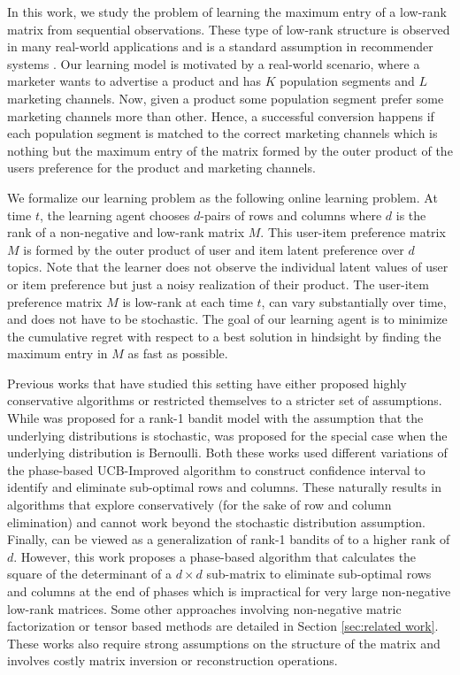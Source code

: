 In this work, we study the problem of learning the maximum entry of a low-rank matrix from sequential observations. These type of low-rank structure is observed in many real-world applications and is a standard assumption in recommender systems \citep{koren2009matrix,ricci2011liorrokach}. Our learning model is motivated by a real-world scenario, where a marketer wants to advertise a product and has $K$ population segments and $L$ marketing channels. Now, given a product some population segment prefer some marketing channels more than other. Hence, a successful conversion happens if each population segment is matched to the correct marketing channels which is nothing but the maximum entry of the matrix formed by the outer product of the users preference for the product and marketing channels.  

We formalize our learning problem as the following online learning problem. At time $t$, the learning agent chooses $d$-pairs of rows and columns where $d$ is the rank of a non-negative and low-rank matrix $M$. This user-item preference matrix $M$ is formed by the outer product of user and item latent preference over $d$ topics. Note that the learner does not observe the individual latent values of user or item preference but just a noisy realization of their product. The user-item preference matrix $M$ is low-rank at each time $t$, can vary substantially over time, and does not have to be stochastic. The goal of our learning agent is to minimize the cumulative regret with respect to a best solution in hindsight by finding the maximum entry in $M$ as fast as possible.



Previous works that have studied this setting have either proposed highly conservative algorithms or restricted themselves to a stricter set of assumptions. While \citet{katariya2016stochastic} was proposed for a rank-1 bandit model with the assumption that the underlying distributions is stochastic, \citet{katariya2017bernoulli} was proposed for the special case when the underlying distribution is Bernoulli. Both these works used different variations of the phase-based UCB-Improved \citep{auer2010ucb} algorithm to construct confidence interval to identify and eliminate sub-optimal rows and columns. These naturally results in algorithms that explore conservatively (for the sake of row and column elimination) and cannot work beyond the stochastic distribution assumption. Finally, \citet{kveton2017stochastic} can be viewed as a generalization of rank-1 bandits of \citet{katariya2016stochastic} to a higher rank of $d$. However, this work proposes a phase-based algorithm that calculates the square of the determinant of a $d\times d$ sub-matrix to eliminate sub-optimal rows and columns at the end of phases which is impractical for very large non-negative low-rank matrices. Some other approaches involving non-negative matric factorization or tensor based methods are detailed in Section \ref{sec:related work}. These works also require strong assumptions on the structure of the matrix and involves costly matrix inversion or reconstruction operations.

